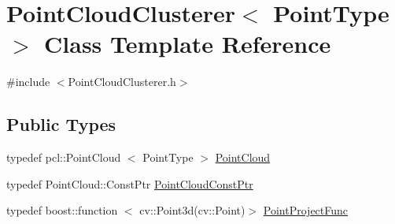 \hypertarget{classPointCloudClusterer}{\section{\-Point\-Cloud\-Clusterer$<$ \-Point\-Type $>$ \-Class \-Template \-Reference}
\label{classPointCloudClusterer}
}


{\ttfamily \#include $<$\-Point\-Cloud\-Clusterer.\-h$>$}

\subsection*{\-Public \-Types}
\begin{DoxyCompactItemize}
\item 
typedef pcl\-::\-Point\-Cloud\*
$<$ \-Point\-Type $>$ \hyperlink{classPointCloudClusterer_aeac82c7494ccf2580112ef55d7e30b39}{\-Point\-Cloud}
\item 
typedef \-Point\-Cloud\-::\-Const\-Ptr \hyperlink{classPointCloudClusterer_a042579611b15a7ae275603b624df3968}{\-Point\-Cloud\-Const\-Ptr}
\item 
typedef boost\-::function\*
$<$ cv\-::\-Point3d(cv\-::\-Point)$>$ \hyperlink{classPointCloudClusterer_adc13c5f02a2a888f33eedbc33188f202}{\-Point\-Project\-Func}
\end{DoxyCompactItemize}
